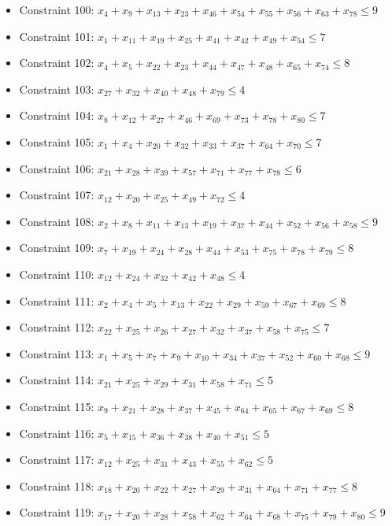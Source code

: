 \documentclass[11pt]{article}
\begin{document}
\begin{itemize}
\item Constraint 100: $x_{4} + x_{9} + x_{13} + x_{23} + x_{46} + x_{54} + x_{55} + x_{56} + x_{63} + x_{78} \le 9$
\item Constraint 101: $x_{1} + x_{11} + x_{19} + x_{25} + x_{41} + x_{42} + x_{49} + x_{54} \le 7$
\item Constraint 102: $x_{4} + x_{5} + x_{22} + x_{23} + x_{44} + x_{47} + x_{48} + x_{65} + x_{74} \le 8$
\item Constraint 103: $x_{27} + x_{32} + x_{40} + x_{48} + x_{79} \le 4$
\item Constraint 104: $x_{8} + x_{12} + x_{27} + x_{46} + x_{69} + x_{73} + x_{78} + x_{80} \le 7$
\item Constraint 105: $x_{1} + x_{4} + x_{20} + x_{32} + x_{33} + x_{37} + x_{64} + x_{70} \le 7$
\item Constraint 106: $x_{21} + x_{28} + x_{39} + x_{57} + x_{71} + x_{77} + x_{78} \le 6$
\item Constraint 107: $x_{12} + x_{20} + x_{25} + x_{49} + x_{72} \le 4$
\item Constraint 108: $x_{2} + x_{8} + x_{11} + x_{13} + x_{19} + x_{37} + x_{44} + x_{52} + x_{56} + x_{58} \le 9$
\item Constraint 109: $x_{7} + x_{19} + x_{24} + x_{28} + x_{44} + x_{53} + x_{75} + x_{78} + x_{79} \le 8$
\item Constraint 110: $x_{12} + x_{24} + x_{32} + x_{42} + x_{48} \le 4$
\item Constraint 111: $x_{2} + x_{4} + x_{5} + x_{13} + x_{22} + x_{29} + x_{59} + x_{67} + x_{69} \le 8$
\item Constraint 112: $x_{22} + x_{25} + x_{26} + x_{27} + x_{32} + x_{37} + x_{58} + x_{75} \le 7$
\item Constraint 113: $x_{1} + x_{5} + x_{7} + x_{9} + x_{10} + x_{34} + x_{37} + x_{52} + x_{60} + x_{68} \le 9$
\item Constraint 114: $x_{21} + x_{25} + x_{29} + x_{31} + x_{58} + x_{71} \le 5$
\item Constraint 115: $x_{9} + x_{21} + x_{28} + x_{37} + x_{45} + x_{64} + x_{65} + x_{67} + x_{69} \le 8$
\item Constraint 116: $x_{5} + x_{15} + x_{36} + x_{38} + x_{40} + x_{51} \le 5$
\item Constraint 117: $x_{12} + x_{25} + x_{31} + x_{43} + x_{55} + x_{62} \le 5$
\item Constraint 118: $x_{18} + x_{20} + x_{22} + x_{27} + x_{29} + x_{31} + x_{64} + x_{71} + x_{77} \le 8$
\item Constraint 119: $x_{17} + x_{20} + x_{28} + x_{58} + x_{62} + x_{64} + x_{68} + x_{75} + x_{79} + x_{80} \le 9$

\end{itemize}
\end{document}
